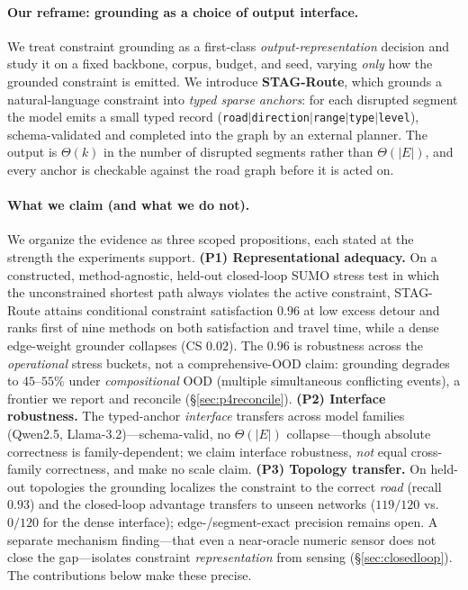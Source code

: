 \paragraph{Our reframe: grounding as a choice of output interface.}
We treat constraint grounding as a first-class \emph{output-representation} decision and study it on a
fixed backbone, corpus, budget, and seed, varying \emph{only} how the grounded constraint is emitted.
We introduce \textbf{STAG-Route}, which grounds a natural-language constraint into \emph{typed sparse
anchors}: for each disrupted segment the model emits a small typed record
(\texttt{road$\mid$direction$\mid$range$\mid$type$\mid$level}), schema-validated and completed into the
graph by an external planner. The output is $\Theta(k)$ in the number of disrupted segments rather than
$\Theta(|E|)$, and every anchor is checkable against the road graph before it is acted on.

\paragraph{What we claim (and what we do not).}
We organize the evidence as three scoped propositions, each stated at the strength the experiments
support. \textbf{(P1) Representational adequacy.} On a constructed, method-agnostic, held-out
closed-loop SUMO stress test in which the unconstrained shortest path always violates the active
constraint, STAG-Route attains conditional constraint satisfaction $0.96$ at low excess detour and ranks
first of nine methods on both satisfaction and travel time, while a dense edge-weight grounder collapses
(CS $0.02$). The $0.96$ is robustness across the \emph{operational} stress buckets, not a
comprehensive-OOD claim: grounding degrades to $45$--$55\%$ under \emph{compositional} OOD (multiple
simultaneous conflicting events), a frontier we report and reconcile (\S\ref{sec:p4reconcile}).
\textbf{(P2) Interface robustness.} The typed-anchor \emph{interface} transfers across model families
(Qwen2.5, Llama-3.2)---schema-valid, no $\Theta(|E|)$ collapse---though absolute correctness is
family-dependent; we claim interface robustness, \emph{not} equal cross-family correctness, and make no
scale claim. \textbf{(P3) Topology transfer.} On held-out topologies the grounding localizes the
constraint to the correct \emph{road} (recall $0.93$) and the closed-loop advantage transfers to unseen
networks ($119/120$ vs.\ $0/120$ for the dense interface); edge-/segment-exact precision remains open. A separate mechanism finding---that even a near-oracle
numeric sensor does not close the gap---isolates constraint \emph{representation} from sensing
(\S\ref{sec:closedloop}). The contributions below make these precise.
